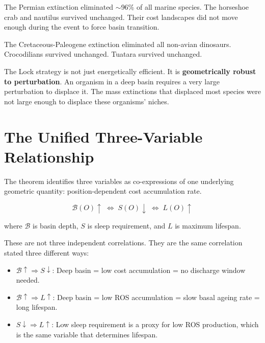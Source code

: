 \documentclass[12pt, a4paper]{article}
\begin{document}
The Permian extinction eliminated $\sim$96\% of all marine
species. The horseshoe crab and nautilus survived unchanged.
Their cost landscapes did not move enough during the event
to force basin transition.

The Cretaceous-Paleogene extinction eliminated all
non-avian dinosaurs. Crocodilians survived unchanged.
Tuatara survived unchanged.

The Lock strategy is not just energetically efficient.
It is \textbf{geometrically robust to perturbation}.
An organism in a deep basin requires a very large
perturbation to displace it. The mass extinctions that
displaced most species were not large enough to displace
these organisms' niches.

\section{The Unified Three-Variable Relationship}
\label{sec:triad}

The theorem identifies three variables as co-expressions of
one underlying geometric quantity: position-dependent cost
accumulation rate.

\begin{equation}
\boxed{
    \mathcal{B}(O) \uparrow \;\Longleftrightarrow\;
    S(O) \downarrow \;\Longleftrightarrow\;
    L(O) \uparrow
}
\label{eq:triad}
\end{equation}

where $\mathcal{B}$ is basin depth, $S$ is sleep requirement,
and $L$ is maximum lifespan.

These are not three independent correlations.
They are the same correlation stated three different ways:

\begin{itemize}
    \item $\mathcal{B} \uparrow \Rightarrow S \downarrow$:
          Deep basin = low cost accumulation = no discharge
          window needed.
    \item $\mathcal{B} \uparrow \Rightarrow L \uparrow$:
          Deep basin = low ROS accumulation = slow basal
          ageing rate = long lifespan.
    \item $S \downarrow \Rightarrow L \uparrow$:
          Low sleep requirement is a proxy for low ROS
          production, which is the same variable that
          determines lifespan.
\end{itemize}
\end{document}
